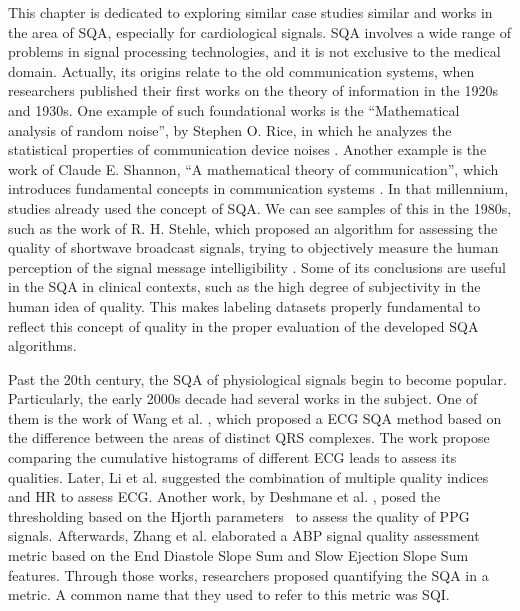 

This chapter is dedicated to exploring similar case studies similar and works in the area of \gls{SQA}, especially for cardiological signals. \gls{SQA} involves a wide range of problems in signal processing technologies, and it is not exclusive to the medical domain. Actually, its origins relate to the old communication systems, when researchers published their first works on the theory of information in the 1920s and 1930s. One example of such foundational works is the ``Mathematical analysis of random noise'', by Stephen O. Rice, in which he analyzes the statistical properties of communication device noises \cite{origins-1}. Another example is the work of Claude E. Shannon, ``A mathematical theory of communication'', which introduces fundamental concepts in communication systems \cite{origins-2}. In that millennium, studies already used the concept of \gls{SQA}. We can see samples of this in the 1980s, such as the work of R. H. Stehle, which proposed an algorithm for assessing the quality of shortwave broadcast signals, trying to objectively measure the human perception of the signal message intelligibility \cite{origins-3}. Some of its conclusions are useful in the \gls{SQA} in clinical contexts, such as the high degree of subjectivity in the human idea of quality. This makes labeling datasets properly fundamental to reflect this concept of quality in the proper evaluation of the developed \gls{SQA} algorithms.
	
Past the 20th century, the \gls{SQA} of physiological signals begin to become popular. Particularly, the early 2000s decade had several works in the subject. One of them is the work of Wang et al. \cite{2000s-1}, which proposed a \gls{ECG} \gls{SQA} method based on the difference between the areas of distinct QRS complexes. The work propose comparing the cumulative histograms of different \gls{ECG} leads to assess its qualities. Later,  Li et al. \cite{2000s-2} suggested the combination of multiple quality indices and \gls{HR} to assess \gls{ECG}. Another work, by Deshmane et al. \cite{2000s-3}, posed the thresholding based on the Hjorth parameters~\cite{hjorth-parameters} to assess the quality of \gls{PPG} signals. Afterwards, Zhang et al. \cite{2000s-4} elaborated a \gls{ABP} signal quality assessment metric based on the End Diastole Slope Sum and Slow Ejection Slope Sum features. Through those works, researchers proposed quantifying the \gls{SQA} in a metric. A common name that they used to refer to this metric was \gls{SQI}.


